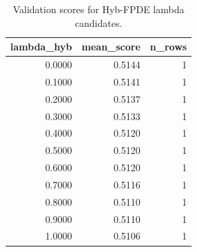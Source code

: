 \begin{table}[t]
\caption{Validation scores for Hyb-FPDE lambda candidates.}
\label{tab:lambda_distribution_computed}
\centering
\begin{tabular}{rrr}
\toprule
lambda\_hyb & mean\_score & n\_rows \\
\midrule
0.0000 & 0.5144 & 1 \\
0.1000 & 0.5141 & 1 \\
0.2000 & 0.5137 & 1 \\
0.3000 & 0.5133 & 1 \\
0.4000 & 0.5120 & 1 \\
0.5000 & 0.5120 & 1 \\
0.6000 & 0.5120 & 1 \\
0.7000 & 0.5116 & 1 \\
0.8000 & 0.5110 & 1 \\
0.9000 & 0.5110 & 1 \\
1.0000 & 0.5106 & 1 \\
\bottomrule
\end{tabular}

\end{table}
